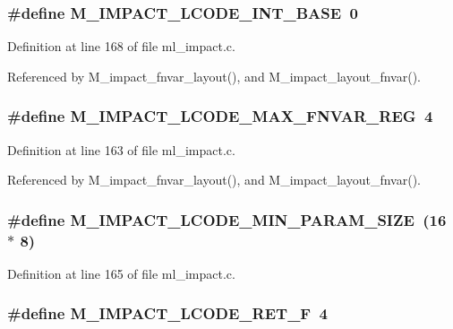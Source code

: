\subsubsection{\setlength{\rightskip}{0pt plus 5cm}\#define M\_\-IMPACT\_\-LCODE\_\-INT\_\-BASE~0}\label{ml__impact_8c_b2ea8bc1b4f275ebf2135f626a531078}




Definition at line 168 of file ml\_\-impact.c.

Referenced by M\_\-impact\_\-fnvar\_\-layout(), and M\_\-impact\_\-layout\_\-fnvar().
\subsubsection{\setlength{\rightskip}{0pt plus 5cm}\#define M\_\-IMPACT\_\-LCODE\_\-MAX\_\-FNVAR\_\-REG~4}\label{ml__impact_8c_05f2dcd44df0022f70cf0105bd40d58f}




Definition at line 163 of file ml\_\-impact.c.

Referenced by M\_\-impact\_\-fnvar\_\-layout(), and M\_\-impact\_\-layout\_\-fnvar().
\subsubsection{\setlength{\rightskip}{0pt plus 5cm}\#define M\_\-IMPACT\_\-LCODE\_\-MIN\_\-PARAM\_\-SIZE~(16 $\ast$ 8)}\label{ml__impact_8c_7e7355d06a46691ae6a4621b042bc7ca}




Definition at line 165 of file ml\_\-impact.c.
\subsubsection{\setlength{\rightskip}{0pt plus 5cm}\#define M\_\-IMPACT\_\-LCODE\_\-RET\_\-F~4}\label{ml__impact_8c_3b1b90af7f7e3d61de272b21654ccb12}




